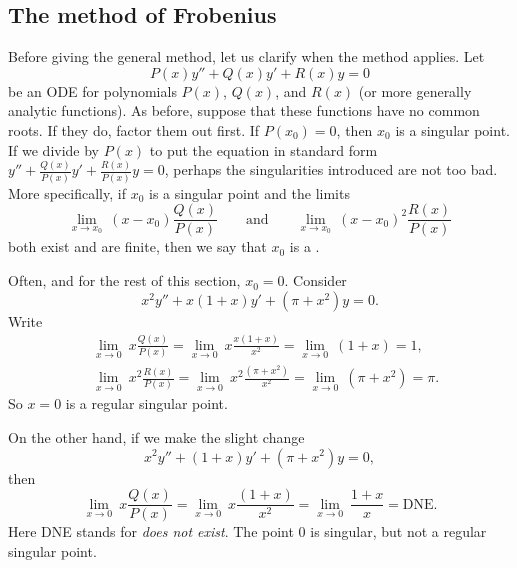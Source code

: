 \subsection{The method of Frobenius}

Before giving the general method, let us clarify when the method applies.
Let
\begin{equation*}
P(x) y'' + Q(x) y' + R(x) y = 0
\end{equation*}
be an ODE for polynomials
$P(x)$, $Q(x)$, and $R(x)$ (or more generally analytic functions).
As before, suppose that these functions have no common roots.
If they do, factor them out first.
If $P(x_0) = 0$, then $x_0$ is a
singular point.
If we divide by $P(x)$ to put the equation in standard form
$y'' + \frac{Q(x)}{P(x)} y' + \frac{R(x)}{P(x)} y = 0$,
perhaps the singularities introduced are not too bad.
More specifically, if $x_0$ is a singular point and the limits
\begin{equation*}
\lim_{x \to x_0} ~ (x-x_0) \frac{Q(x)}{P(x)}
\qquad \text{and} \qquad
\lim_{x \to x_0} ~ (x-x_0)^2 \frac{R(x)}{P(x)}
\end{equation*}
both exist and are finite,
then we say that $x_0$ is
a \emph{}.

\begin{example}
Often, and for the rest of this section, $x_0 = 0$.  Consider
\begin{equation*}
x^2y'' + x(1+x)y' + (\pi+x^2)y = 0 .
\end{equation*}
Write
\begin{align*}
& \lim_{x \to 0} ~x \frac{Q(x)}{P(x)} = 
\lim_{x \to 0} ~x \frac{x(1+x)}{x^2} = \lim_{x \to 0} ~(1+x) = 1 ,
\\
& \lim_{x \to 0} ~x^2 \frac{R(x)}{P(x)} = 
\lim_{x \to 0} ~x^2 \frac{(\pi+x^2)}{x^2} = \lim_{x \to 0} ~(\pi+x^2) = \pi .
\end{align*}
So $x = 0$ is a regular singular point.

On the other hand, if we make the slight change
\begin{equation*}
x^2y'' + (1+x)y' + (\pi+x^2)y = 0 ,
\end{equation*}
then
\begin{equation*}
\lim_{x \to 0} ~x \frac{Q(x)}{P(x)} = 
\lim_{x \to 0} ~x \frac{(1+x)}{x^2} = \lim_{x \to 0} ~\frac{1+x}{x} =
\text{DNE}.
\end{equation*}
Here DNE stands for \emph{does not exist}.
The point $0$ is singular, but not a regular singular point.
\end{example}

